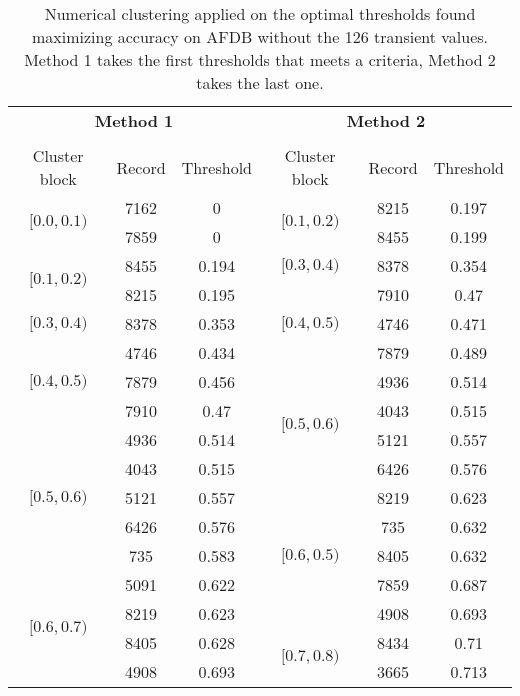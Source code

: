\begin{table}[h]
\begin{center}
\begin{threeparttable}
\caption{Numerical clustering applied on the optimal thresholds found maximizing accuracy on AFDB without the 126 transient values. Method 1 takes the first thresholds  that meets a criteria, Method 2 takes the last one.}
\label{table:clustering}
\scriptsize
  \begin{tabular}{c c c | c c c}
  \toprule
  \multicolumn{3}{c|}{\textbf{Method 1}} & \multicolumn{3}{c}{\textbf{Method 2}} \\
  \cline{1-3} \cline{4-6}
  \\
  Cluster block & Record & Threshold & Cluster block & Record & Threshold\\
  \midrule  
  \multirow{2}{*}{$[0.0, 0.1)$} & 7162 & 0 & \multirow{2}{*}{$[0.1, 0.2)$} & 8215 & 0.197 \\
  & 7859 & 0  & & 8455 & 0.199 \\
  \cline{1-6}
  \multirow{2}{*}{$[0.1, 0.2)$} & 8455 & 0.194 & $[0.3, 0.4)$ & 8378 & 0.354 \\
  \cline{4-6}
  & 8215 & 0.195 & \multirow{3}{*}{$[0.4, 0.5)$} & 7910 & 0.47 \\
  \cline{1-3}
  $[0.3, 0.4)$ & 8378 & 0.353 & & 4746 & 0.471\\
  \cline{1-3}
  \multirow{3}{*}{$[0.4, 0.5)$} & 4746 & 0.434 & & 7879 & 0.489 \\
  \cline{4-6}
  & 7879 & 0.456 & \multirow{4}{*}{$[0.5, 0.6)$} & 4936 & 0.514 \\
  & 7910 & 0.47 & & 4043 & 0.515 \\
  \cline{1-3}
  \multirow{5}{*}{$[0.5, 0.6)$} & 4936 & 0.514 & & 5121 & 0.557 \\
  & 4043 & 0.515  & & 6426 & 0.576 \\
  \cline{4-6}
  & 5121 & 0.557 & \multirow{5}{*}{$[0.6, 0.5)$} & 8219 & 0.623 \\
  & 6426 & 0.576 & & 735 & 0.632 \\
  & 735 & 0.583 & & 8405 & 0.632 \\
  \cline{1-3}
  \multirow{4}{*}{$[0.6, 0.7)$} & 5091 & 0.622 & & 7859 & 0.687 \\
  & 8219 & 0.623  & & 4908 & 0.693 \\
  \cline{4-6}
  & 8405 & 0.628  & \multirow{5}{*}{$[0.7, 0.8)$} & 8434 & 0.71 \\
  & 4908 & 0.693  & & 3665 & 0.713 \\
  \cline{1-3}

\end{tabular}
\end{threeparttable}
\end{center}
\end{table}
